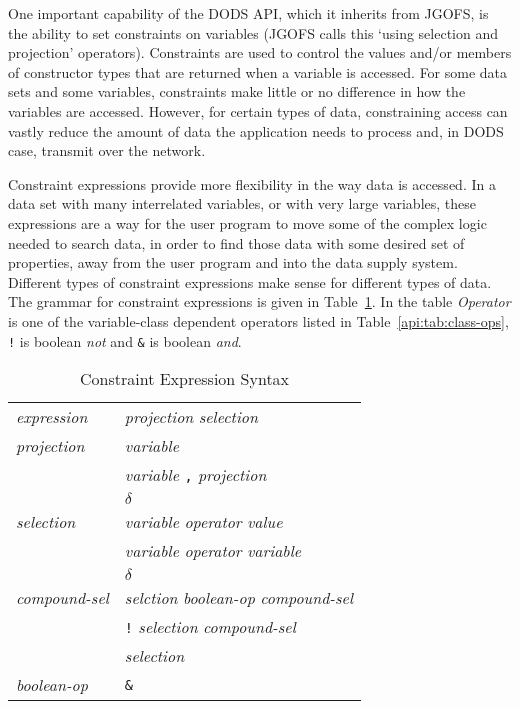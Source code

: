 One important capability of the DODS API, which it inherits from JGOFS, is
the ability to set constraints on variables (JGOFS calls this `using
selection and projection' operators).  Constraints are used to control the
values and/or members of constructor types that are returned when a variable
is accessed. For some data sets and some variables, constraints make little
or no difference in how the variables are accessed.  However, for certain
types of data, constraining access can vastly reduce the amount of data the
application needs to process and, in DODS case, transmit over the network.

\label{api:constraints}
Constraint expressions provide more flexibility in the way data is accessed.
In a data set with many interrelated variables, or with very large variables,
these expressions are a way for the user program to move some of the complex
logic needed to search data, in order to find those data with some desired
set of properties, away from the user program and into the data supply
system.  Different types of constraint expressions make sense for different
types of data. The grammar for constraint expressions is given in
Table~\ref{api:tab:expr}.  In the table {\em Operator\/} is one of the
variable-class dependent operators listed in Table~\ref{api:tab:class-ops},
{\tt !} is boolean {\em not\/} and {\tt \&} is boolean {\em and}.

\begin{table}
\caption{Constraint Expression Syntax}
\label{api:tab:expr}
\begin{center}
\begin{tabular}{ll} \hline

{\em expression\/} & {\em projection} {\em selection \/} \\

{\em projection\/} & {\em variable\/} \\
                   & {\em variable} {\tt ,} {\em projection\/} \\
                   & $\delta$ \\

{\em selection\/}  & {\em variable} {\em operator} {\em value\/} \\
                   & {\em variable} {\em operator} {\em variable\/} \\
                   & $\delta$ \\

{\em compound-sel\/} & {\em selction} {\em boolean-op} {\em compound-sel\/} \\ 
                     & {\tt !} {\em selection} {\em compound-sel\/} \\
                     & {\em selection\/} \\

{\em boolean-op\/} & {\tt \&} \\
\end{tabular}
\end{center}
\end{table}

